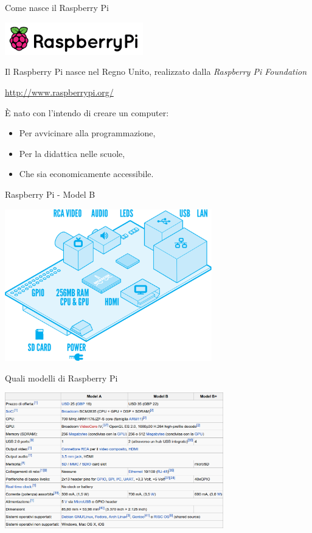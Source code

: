 \documentclass[xcolor=svgnames,11pt]{beamer}
\begin{document}
\begin{frame}{Come nasce il Raspberry Pi}
\begin{center}
\includegraphics[width=6cm]{logo_raspi.png}
\end{center}
\pause

Il Raspberry Pi nasce nel Regno Unito, realizzato dalla \emph{Raspberry Pi Foundation}

\begin{center}
\url{http://www.raspberrypi.org/}
\end{center}

\pause
\medskip

\`E nato con l'intendo di creare un computer:
\pause
\begin{itemize}
\item Per avvicinare alla programmazione,
\pause
\item Per la didattica nelle scuole,
\pause
\item Che sia economicamente accessibile.
\end{itemize}
\end{frame}

\begin{frame}{Raspberry Pi - Model B}
\begin{center}
\includegraphics[width=9cm]{scheme.png}
\end{center}
\end{frame}

\begin{frame}{Quali modelli di Raspberry Pi}
\begin{center}
\includegraphics[width=9.5cm]{table.png}
\end{center}
\end{frame}
\end{document}
